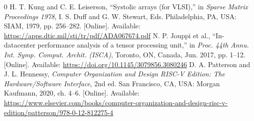 \documentclass[conference]{IEEEtran}
\begin{document}
\begin{thebibliography}{0}
 H. T. Kung and C. E. Leiserson, ``Systolic arrays (for VLSI),'' in \textit{Sparse Matrix Proceedings 1978}, I. S. Duff and G. W. Stewart, Eds. Philadelphia, PA, USA: SIAM, 1979, pp. 256--282. [Online]. Available: \url{https://apps.dtic.mil/sti/tr/pdf/ADA067674.pdf}
 N. P. Jouppi et al., ``In-datacenter performance analysis of a tensor processing unit,'' in \textit{Proc. 44th Annu. Int. Symp. Comput. Archit. (ISCA)}, Toronto, ON, Canada, Jun. 2017, pp. 1--12. [Online]. Available: \url{https://doi.org/10.1145/3079856.3080246}
 D. A. Patterson and J. L. Hennessy, \textit{Computer Organization and Design RISC-V Edition: The Hardware/Software Interface}, 2nd ed. San Francisco, CA, USA: Morgan Kaufmann, 2020, ch. 4--6. [Online]. Available: \url{https://www.elsevier.com/books/computer-organization-and-design-risc-v-edition/patterson/978-0-12-812275-4}
\end{thebibliography}
\end{document}
